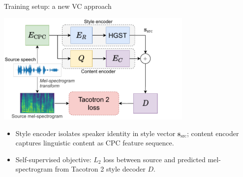 \documentclass[final]{beamer}
\newlength{\columnheight}
\begin{document}
\begin{frame}[t]
\begin{columns}[T]
\begin{column}{.33\linewidth}
\begin{minipage}[T]{.97\textwidth}
{%

}\end{minipage}
\end{column}



\begin{column}{.33\linewidth}
\centering
\begin{minipage}[T]{.97\textwidth}\parbox[t][\columnheight]{\textwidth}{



\begin{block}{Training setup: a new VC approach}
    \vspace*{-0.3cm}
    \centerline{\includegraphics[width=0.75\textwidth]{figures/HGST12_training.pdf}}
    \begin{itemize}
        \setlength{\itemsep}{0.5ex}
        \item Style encoder isolates speaker identity in style vector $\mathbf{s}_{\text{src}}$; content encoder captures linguistic content as CPC feature sequence. 
        \item Self-supervised objective: $L_2$ loss between source and predicted mel-spectrogram from Tacotron 2 style decoder $D$.
    \end{itemize}
\end{block}

}
\end{minipage}
\end{column}
\end{columns}
\end{frame}
\end{document}
